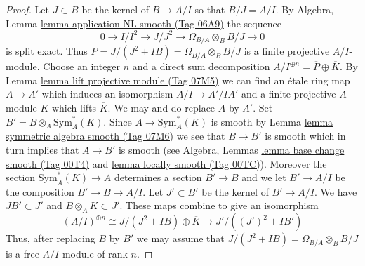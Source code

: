 \documentclass{amsart}
\theoremstyle{plain}
\theoremstyle{definition}
\theoremstyle{remark}
\numberwithin{equation}{subsection}
\begin{document}
\begin{proof}
Let $J \subset B$ be the kernel of $B \to A/I$ so that $B/J = A/I$. By
Algebra, Lemma \href{https://stacks.math.columbia.edu/tag/06A9}{lemma application NL smooth (Tag 06A9)} the sequence
$$
0 \to I/I^2 \to J/J^2 \to \Omega_{B/A} \otimes_B B/J \to 0
$$
is split exact. Thus $\overline{P} = J/(J^2 + IB) = \Omega_{B/A} \otimes_B B/J$
is a finite projective $A/I$-module. Choose an integer $n$ and a direct sum
decomposition $A/I^{\oplus n} = \overline{P} \oplus \overline{K}$.
By Lemma \href{https://stacks.math.columbia.edu/tag/07M5}{lemma lift projective module (Tag 07M5)} we can find an
\'etale ring map $A \to A'$ which induces an isomorphism
$A/I \to A'/IA'$ and a finite projective $A$-module $K$ which
lifts $\overline{K}$. We may and do replace $A$ by $A'$.
Set $B' = B \otimes_A \text{Sym}_A^*(K)$. Since $A \to \text{Sym}_A^*(K)$
is smooth by Lemma \href{https://stacks.math.columbia.edu/tag/07M6}{lemma symmetric algebra smooth (Tag 07M6)} we see that
$B \to B'$ is smooth which in turn implies that $A \to B'$ is smooth (see
Algebra, Lemmas \href{https://stacks.math.columbia.edu/tag/00T4}{lemma base change smooth (Tag 00T4)} and
\href{https://stacks.math.columbia.edu/tag/00TC}{lemma locally smooth (Tag 00TC)}).
Moreover the section $\text{Sym}^*_A(K) \to A$ determines a section
$B' \to B$ and we let $B' \to A/I$ be the composition $B' \to B \to A/I$.
Let $J' \subset B'$ be the kernel of $B' \to A/I$. We have
$JB' \subset J'$ and $B \otimes_A K \subset J'$. These maps combine
to give an isomorphism
$$
(A/I)^{\oplus n} \cong J/(J^2 + IB) \oplus \overline{K}
\longrightarrow
J'/((J')^2 + IB')
$$
Thus, after replacing $B$ by $B'$ we may assume that
$J/(J^2 + IB) = \Omega_{B/A} \otimes_B B/J$ is a free
$A/I$-module of rank $n$.


\end{proof}
\end{document}
